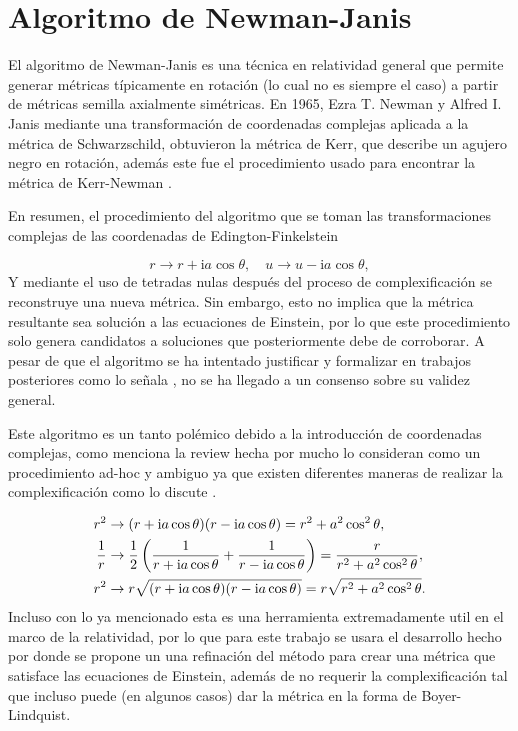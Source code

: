 
\section[Algoritmo de Newman-Janis]{Algoritmo de Newman-Janis}

El algoritmo de Newman-Janis es una técnica en relatividad general que permite generar métricas típicamente en rotación (lo cual no es siempre el caso) a partir de métricas semilla  axialmente simétricas. En 1965, Ezra T. Newman y Alfred I. Janis \cite{newman-1965}  mediante una transformación de coordenadas complejas aplicada a la métrica de Schwarzschild, obtuvieron la métrica de Kerr, que describe un agujero negro en rotación, además este fue el procedimiento usado para encontrar la métrica de Kerr-Newman\cite{newman-1965b} .

En resumen, el procedimiento del algoritmo que se toman las transformaciones complejas de las coordenadas de Edington-Finkelstein

\begin{equation}
    r \rightarrow r+\mathrm{i} a \cos \theta, \quad u \rightarrow u-\mathrm{i} a \cos \theta,
\end{equation}
Y mediante el uso de tetradas nulas después del proceso de complexificación se reconstruye una nueva métrica. Sin embargo, esto no implica que la métrica resultante sea solución a las ecuaciones de Einstein, por lo que este procedimiento solo genera candidatos a soluciones que posteriormente debe de corroborar.
A pesar de que el algoritmo se ha intentado justificar y formalizar en trabajos posteriores como lo señala \cite{drake-2000}, no se ha llegado a un consenso sobre su validez general.

Este algoritmo es un tanto polémico debido a la introducción de coordenadas complejas, como menciona la review hecha por \cite{drake-2000} mucho lo consideran como un procedimiento ad-hoc y ambiguo ya que existen diferentes maneras de realizar la complexificación como lo discute \cite{azreg-ainou-2014} .

\begin{align}
    r^2         & \rightarrow(r+\mathrm{i} a \cos \theta)(r-\mathrm{i} a \cos \theta)=r^2+a^2 \cos ^2 \theta,                                                     \\
    \frac{1}{r} & \rightarrow \frac{1}{2}\left(\frac{1}{r+\mathrm{i} a \cos \theta}+\frac{1}{r-\mathrm{i} a \cos \theta}\right)=\frac{r}{r^2+a^2 \cos ^2 \theta}, \\
    r^2         & \rightarrow r \sqrt{(r+\mathrm{i} a \cos \theta)(r-\mathrm{i} a \cos \theta)}=r \sqrt{r^2+a^2 \cos ^2 \theta} .
\end{align}
Incluso con lo ya mencionado esta es una herramienta extremadamente util en el marco de la relatividad, por lo que para este trabajo se usara el desarrollo hecho por \cite{azreg-ainou-2014} donde se propone un una refinación del método para crear una métrica que satisface las ecuaciones de Einstein, además de no requerir la complexificación tal que incluso puede (en algunos casos) dar la métrica en la forma de Boyer-Lindquist.

